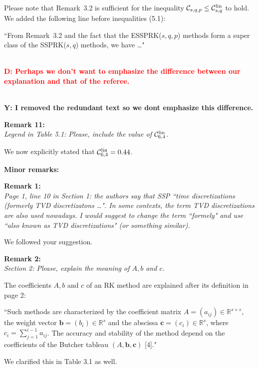 \documentclass[12pt]{article}
\newcommand{\remark}[2]{\vspace{25pt} \noindent \textbf{Remark #1:\newline} \textit{#2}\vspace{15pt}}
\renewcommand{\newline}{\vspace{15pt}\\}
\newcommand{\sspcoef}{\mathcal{C}}
\newcommand{\clin}{\sspcoef^{\textnormal{lin}}_{s,q}}
\newcommand{\david}[1]{\textcolor{red}{\\\textbf{D: \footnotesize #1}\\}}
\newcommand{\yiannis}[1]{\textcolor{OliveGreen}{\\\textbf{Y: \footnotesize #1}\\}}
\begin{document}
Please note that Remark~3.2 is sufficient for the inequality 
$\sspcoef_{s,q,p} \leq \clin$ to hold.
We added the following line before inequalities (5.1):

``From Remark~3.2 and the fact that the ESSPRK($s,q,p$) methods 
form a super class of the SSPRK($s,q$) methods, we have \dots"

\david{Perhaps we don't want to emphasize the difference between our explanation and that of the referee.}

\yiannis{I removed the redundant text so we dont emphasize this difference.}

\remark{11}{
Legend in Table 5.1: Please, include the value of $\sspcoef^{\textnormal{lin}}_{6,4}$.}

We now explicitly stated that $\sspcoef^{\textnormal{lin}}_{6,4}=0.44$.
\vspace{20pt}

\noindent \textbf{\large Minor remarks:}

\remark{1}{
Page 1, line 10 in Section 1: the authors say that SSP ``time discretizations (formerly
TVD discretizatons \dots". 
In some contexts, the term TVD discretizations are also used nowadays. 
I would suggest to change the term ``formely" and use ``also known as TVD discretizations" 
(or something similar).}

We followed your suggestion.

\remark{2}{
Section 2: Please, explain the meaning of $A, b$ and $c$.}

The coefficients $A, b$ and $c$ of an RK method are explained after its definition in page 2:

``Such methods are characterized by the coefficient matrix $A = (a_{ij}) \in 
\mathbb{R}^{s \times s}$, the weight vector $\bm{b} = (b_i) \in \mathbb{R}^s$
and the abscissa $\bm{c} = (c_i) \in \mathbb{R}^s$, where 
$c_i = \sum_{j=1}^{i-1}a_{ij}$.
The accuracy and stability of the method depend on the coefficients of the 
Butcher tableau $(A,\bm{b},\bm{c})$ [4]."

We clarified this in Table 3.1 as well.
\end{document}
